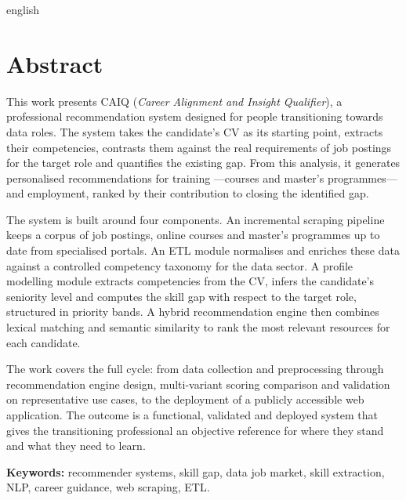 \vspace{2em}
\begin{otherlanguage*}{english}
\section*{Abstract}

This work presents CAIQ (\textit{Career Alignment and Insight Qualifier}), a
professional recommendation system designed for people transitioning towards data roles.
The system takes the candidate's CV as its starting point, extracts their competencies,
contrasts them against the real requirements of job postings for the target role and
quantifies the existing gap. From this analysis, it generates personalised
recommendations for training ---courses and master's programmes--- and employment,
ranked by their contribution to closing the identified gap.

The system is built around four components. An incremental scraping pipeline keeps a
corpus of job postings, online courses and master's programmes up to date from
specialised portals. An ETL module normalises and enriches these data against a
controlled competency taxonomy for the data sector. A profile modelling module extracts
competencies from the CV, infers the candidate's seniority level and computes the skill
gap with respect to the target role, structured in priority bands. A hybrid
recommendation engine then combines lexical matching and semantic similarity to rank
the most relevant resources for each candidate.

The work covers the full cycle: from data collection and preprocessing through
recommendation engine design, multi-variant scoring comparison and validation on
representative use cases, to the deployment of a publicly accessible web application.
The outcome is a functional, validated and deployed system that gives the transitioning
professional an objective reference for where they stand and what they need to learn.

\vspace{0.4em}
\noindent\textbf{Keywords:} recommender systems, skill gap, data job market, skill
extraction, NLP, career guidance, web scraping, ETL.
\end{otherlanguage*}
